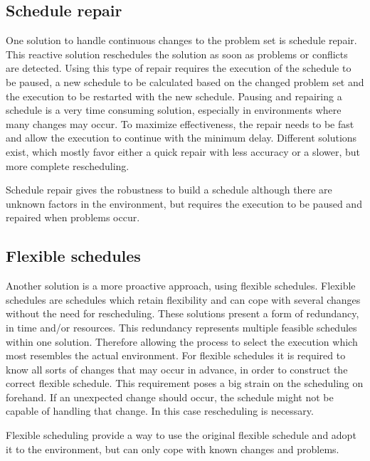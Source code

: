 \documentclass{article}
\begin{document}
\subsection{Schedule repair}
One solution to handle continuous changes to the problem set is schedule repair.
This reactive solution reschedules the solution as soon as problems or conflicts are detected.
Using this type of repair requires the execution of the schedule to be paused, a new schedule to be calculated based on the changed problem set and the execution to be restarted with the new schedule.
Pausing and repairing a schedule is a very time consuming solution, especially in environments where many changes may occur.
To maximize effectiveness, the repair needs to be fast and allow the execution to continue with the minimum delay.
Different solutions exist, which mostly favor either a quick repair with less accuracy or a slower, but more complete rescheduling.
\cite{policella07}

Schedule repair gives the robustness to build a schedule although there are unknown factors in the environment, but requires the execution to be paused and repaired when problems occur.

\subsection{Flexible schedules}
Another solution is a more proactive approach, using flexible schedules.
Flexible schedules are schedules which retain flexibility and can cope with several changes without the need for rescheduling.
These solutions present a form of redundancy, in time and/or resources.
This redundancy represents multiple feasible schedules within one solution.
Therefore allowing the process to select the execution which most resembles the actual environment.
For flexible schedules it is required to know all sorts of changes that may occur in advance, in order to construct the correct flexible schedule.
This requirement poses a big strain on the scheduling on forehand.
If an unexpected change should occur, the schedule might not be capable of handling that change.
In this case rescheduling is necessary.

Flexible scheduling provide a way to use the original flexible schedule and adopt it to the environment, but can only cope with known changes and problems.
\end{document}

